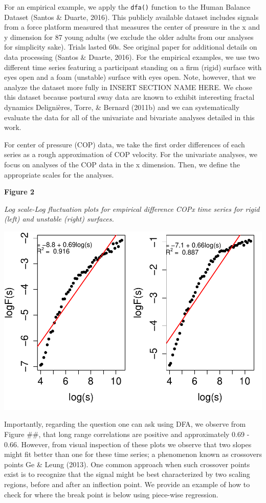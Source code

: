 \documentclass[
  man]{apa6}
\begin{document}
For an empirical example, we apply the \texttt{dfa()} function to the Human
Balance Dataset (Santos \& Duarte, 2016). This publicly available dataset includes
signals from a force platform measured that measures the center of
pressure in the x and y dimension for 87 young adults (we exclude the
older adults from our analyses for simplicity sake). Trials lasted 60s.
See original paper for additional details on data processing
(Santos \& Duarte, 2016). For the empirical examples, we use two different time
series featuring a participant standing on a firm (rigid) surface with
eyes open and a foam (unstable) surface with eyes open. Note, however,
that we analyze the dataset more fully in INSERT SECTION NAME HERE. We
chose this dataset because postural sway data are known to exhibit
interesting fractal dynamics Delignières, Torre, \& Bernard (2011b) and we can
systematically evaluate the data for all of the univariate and bivariate
analyses detailed in this work.

For center of pressure (COP) data, we take the first order differences
of each series as a rough approximation of COP velocity. For the
univariate analyses, we focus on analyses of the COP data in the x
dimension. Then, we define the appropriate scales for the analyses.

\textbf{Figure 2}

\emph{Log scale-Log fluctuation plots for empirical difference COPx time
series for rigid (left) and unstable (right) surfaces.}

\includegraphics{fractal_regression_paper_brm_files/figure-latex/unnamed-chunk-5-1.pdf}

Importantly, regarding the question one can ask using DFA, we observe
from Figure \#\#, that long range correlations are positive and
approximately 0.69 -
0.66. However, from visual inspection of
these plots we observe that two slopes might fit better than one for
these time series; a phenomenon known as crossovers points Ge \& Leung (2013). One common approach when such crossover points exist is to
recognize that the signal might be best characterized by two scaling
regions, before and after an inflection point. We provide an example of
how to check for where the break point is below using piece-wise
regression.
\end{document}
